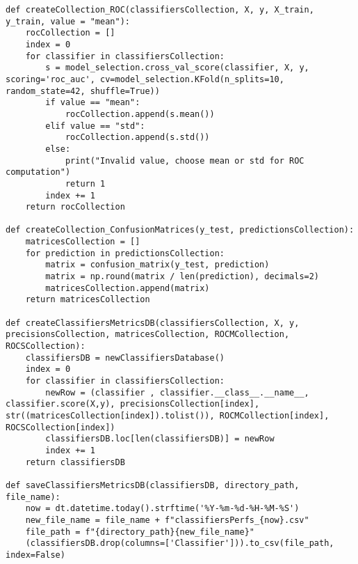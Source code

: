 \begin{lstlisting}[caption={Fonctions permettant de créer et d'entraîner des classifieurs}]
def createCollection_ROC(classifiersCollection, X, y, X_train, y_train, value = "mean"):
    rocCollection = []
    index = 0
    for classifier in classifiersCollection:
        s = model_selection.cross_val_score(classifier, X, y, scoring='roc_auc', cv=model_selection.KFold(n_splits=10, random_state=42, shuffle=True))
        if value == "mean":
            rocCollection.append(s.mean())
        elif value == "std":
            rocCollection.append(s.std())
        else:
            print("Invalid value, choose mean or std for ROC computation")
            return 1
        index += 1
    return rocCollection

def createCollection_ConfusionMatrices(y_test, predictionsCollection):
    matricesCollection = []
    for prediction in predictionsCollection:
        matrix = confusion_matrix(y_test, prediction)
        matrix = np.round(matrix / len(prediction), decimals=2)
        matricesCollection.append(matrix)
    return matricesCollection

def createClassifiersMetricsDB(classifiersCollection, X, y, precisionsCollection, matricesCollection, ROCMCollection, ROCSCollection):
    classifiersDB = newClassifiersDatabase()
    index = 0
    for classifier in classifiersCollection:
        newRow = (classifier , classifier.__class__.__name__, classifier.score(X,y), precisionsCollection[index], str((matricesCollection[index]).tolist()), ROCMCollection[index], ROCSCollection[index])
        classifiersDB.loc[len(classifiersDB)] = newRow
        index += 1
    return classifiersDB

def saveClassifiersMetricsDB(classifiersDB, directory_path, file_name):
    now = dt.datetime.today().strftime('%Y-%m-%d-%H-%M-%S')
    new_file_name = file_name + f"classifiersPerfs_{now}.csv"
    file_path = f"{directory_path}{new_file_name}"
    (classifiersDB.drop(columns=['Classifier'])).to_csv(file_path, index=False)
\end{lstlisting}

